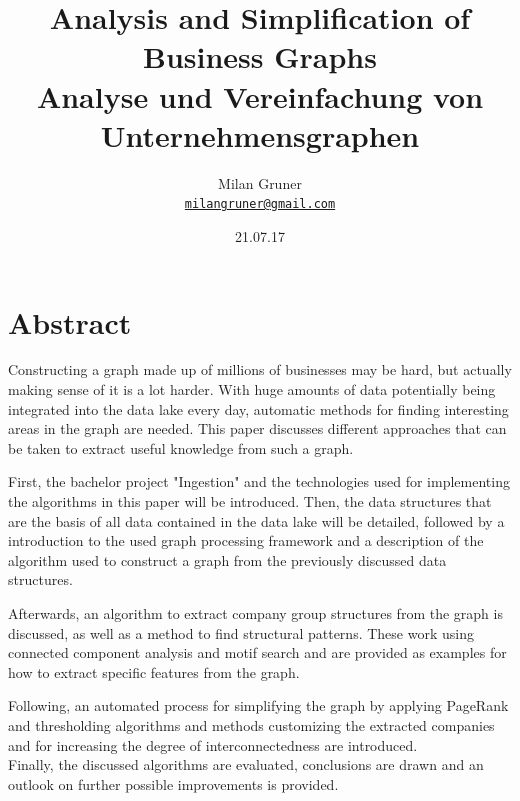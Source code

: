 \documentclass[
  a4paper,     %
  titlepage,   %
  oneside,     %
  parskip      %
]{scrartcl}          %
\title{
  Analysis and Simplification of\\Business Graphs
  \\ \bigskip
  \large{Analyse und Vereinfachung von Unternehmensgraphen}
}
\author{Milan Gruner\\\small{\href{mailto:milangruner@gmail.com}{\nolinkurl{milangruner@gmail.com}}}}
\date{21.07.17}
\begin{document}
  \maketitle %

  \section*{Abstract}
  { \large
    Constructing a graph made up of millions of businesses may be hard, but actually making sense of it is a lot harder.
    With huge amounts of data potentially being integrated into the data lake every day, automatic methods for finding interesting areas in the graph are needed.
    This paper discusses different approaches that can be taken to extract useful knowledge from such a graph.

    First, the bachelor project "Ingestion" and the technologies used
    for implementing the algorithms in this paper will be introduced.
    Then, the data structures that are the basis of all data contained in the
    data lake will be detailed, followed by a introduction to the used graph processing
    framework and a description of the algorithm used to construct a graph from the
    previously discussed data structures.

    Afterwards, an algorithm to extract company group structures from the graph
    is discussed, as well as a method to find structural patterns. These work using
    connected component analysis and motif search and are provided as examples for
    how to extract specific features from the graph.

    Following, an automated process for simplifying the graph by applying PageRank
    and thresholding algorithms and methods customizing the extracted companies
    and for increasing the degree of interconnectedness are introduced.\\
    Finally, the discussed algorithms are evaluated, conclusions are drawn
    and an outlook on further possible improvements is provided.
  }
  \clearpage
\end{document}
